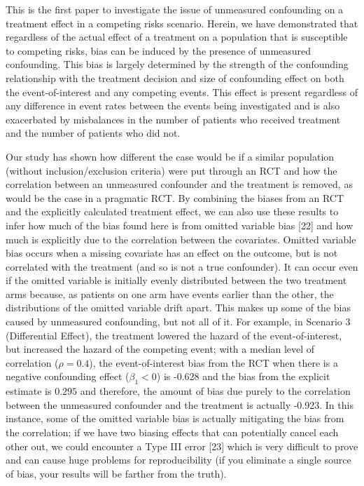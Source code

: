 \documentclass[12pt,PhD,twoside,openright]{muthesis}
\begin{document}
This is the first paper to investigate the issue of unmeasured confounding on a treatment effect in a competing risks scenario. Herein, we have demonstrated that regardless of the actual effect of a treatment on a population that is susceptible to competing risks, bias can be induced by the presence of unmeasured confounding. This bias is largely determined by the strength of the confounding relationship with the treatment decision and size of confounding effect on both the event-of-interest and any competing events. This effect is present regardless of any difference in event rates between the events being investigated and is also exacerbated by misbalances in the number of patients who received treatment and the number of patients who did not.

Our study has shown how different the case would be if a similar population (without inclusion/exclusion criteria) were put through an RCT and how the correlation between an unmeasured confounder and the treatment is removed, as would be the case in a pragmatic RCT. By combining the biases from an RCT and the explicitly calculated treatment effect, we can also use these results to infer how much of the bias found here is from omitted variable bias {[}22{]} and how much is explicitly due to the correlation between the covariates. Omitted variable bias occurs when a missing covariate has an effect on the outcome, but is not correlated with the treatment (and so is not a true confounder). It can occur even if the omitted variable is initially evenly distributed between the two treatment arms because, as patients on one arm have events earlier than the other, the distributions of the omitted variable drift apart. This makes up some of the bias caused by unmeasured confounding, but not all of it. For example, in Scenario 3 (Differential Effect), the treatment lowered the hazard of the event-of-interest, but increased the hazard of the competing event; with a median level of correlation (\(\rho=0.4\)), the event-of-interest bias from the RCT when there is a negative confounding effect (\(\beta_1<0\)) is -0.628 and the bias from the explicit estimate is \(0.295\) and therefore, the amount of bias due purely to the correlation between the unmeasured confounder and the treatment is actually -0.923. In this instance, some of the omitted variable bias is actually mitigating the bias from the correlation; if we have two biasing effects that can potentially cancel each other out, we could encounter a Type III error {[}23{]} which is very difficult to prove and can cause huge problems for reproducibility (if you eliminate a single source of bias, your results will be farther from the truth).
\end{document}
